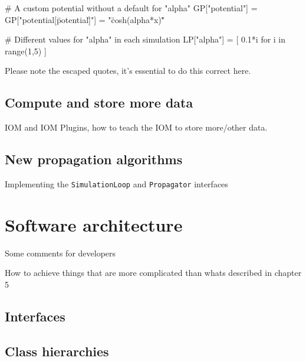 \documentclass[a4paper,10pt]{report}
\begin{document}
\begin{python}
  # A custom potential without a default for "alpha"
  GP["potential"] = {}
  GP["potential[\"potential\"]"] = "\"cosh(alpha*x)\""

  # Different values for "alpha" in each simulation
  LP["alpha"] = [ 0.1*i for i in range(1,5) ]
\end{python}

Please note the escaped quotes, it's essential to do this correct here.



\section{Compute and store more data}

IOM and IOM Plugins, how to teach the IOM to store more/other data.

\section{New propagation algorithms}

Implementing the \texttt{SimulationLoop} and \texttt{Propagator} interfaces



\chapter{Software architecture}

Some comments for developers

How to achieve things that are more complicated than whats
described in chapter 5

\section{Interfaces}

\section{Class hierarchies}
\end{document}
